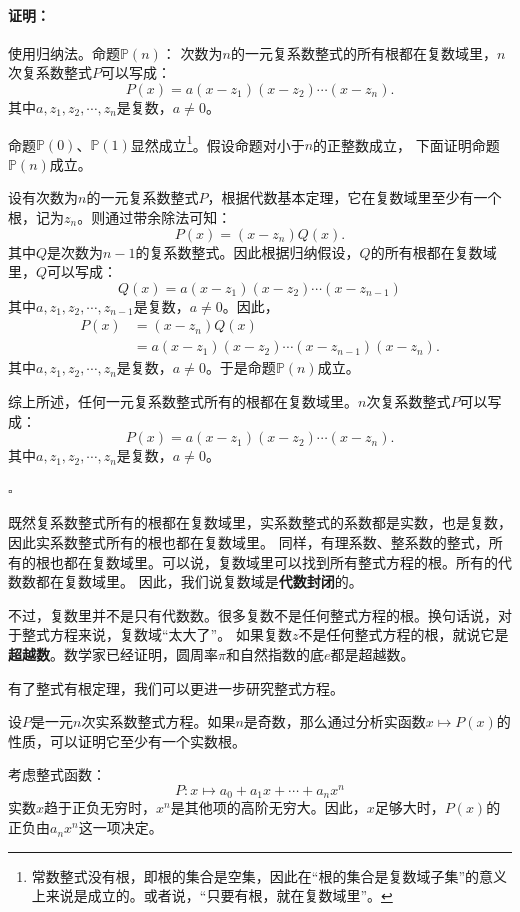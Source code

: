 \documentclass[12pt,UTF8]{ctexbook}
\theoremstyle{definition}
\theoremstyle{plain}
\renewenvironment{proof}{\paragraph{\textbf{证明：}}}{\hfill$\square$}
\begin{document}
\begin{appendix}
\begin{proof}
    使用归纳法。命题$\mathbb{P}(n)$：
    次数为$n$的一元复系数整式的所有根都在复数域里，$n$次复系数整式$P$可以写成：
    $$ P(x) = a(x - z_1)(x - z_2)\cdots(x - z_n).$$
    其中$a, z_1, z_2,\cdots, z_n$是复数，$a\neq 0$。 

    命题$\mathbb{P}(0)$、$\mathbb{P}(1)$显然成立\footnote{常数整式没有根，即根的集合是空集，因此在“根的集合是复数域子集”的意义上来说是成立的。或者说，“只要有根，就在复数域里”。}。假设命题对小于$n$的正整数成立，
    下面证明命题$\mathbb{P}(n)$成立。

    设有次数为$n$的一元复系数整式$P$，根据代数基本定理，它在复数域里至少有一个根，记为$z_n$。则通过带余除法可知：
    $$ P(x) = (x - z_n)Q(x).$$
    其中$Q$是次数为$n-1$的复系数整式。因此根据归纳假设，$Q$的所有根都在复数域里，$Q$可以写成：
    $$ Q(x) = a(x - z_1)(x - z_2)\cdots(x - z_{n-1})$$
    其中$a, z_1, z_2,\cdots, z_{n-1}$是复数，$a\neq 0$。因此，
    \begin{align*} 
        P(x) &= (x - z_n)Q(x) \\
        &= a(x - z_1)(x - z_2)\cdots(x - z_{n-1})(x - z_n).
    \end{align*}
    其中$a, z_1, z_2,\cdots, z_n$是复数，$a\neq 0$。于是命题$\mathbb{P}(n)$成立。

    综上所述，任何一元复系数整式所有的根都在复数域里。$n$次复系数整式$P$可以写成：
    $$ P(x) = a(x - z_1)(x - z_2)\cdots(x - z_n).$$
    其中$a, z_1, z_2,\cdots, z_n$是复数，$a\neq 0$。 

\end{proof}

既然复系数整式所有的根都在复数域里，实系数整式的系数都是实数，也是复数，因此实系数整式所有的根也都在复数域里。
同样，有理系数、整系数的整式，所有的根也都在复数域里。可以说，复数域里可以找到所有整式方程的根。所有的代数数都在复数域里。
因此，我们说复数域是\textbf{代数封闭}的。

不过，复数里并不是只有代数数。很多复数不是任何整式方程的根。换句话说，对于整式方程来说，复数域“太大了”。
如果复数$z$不是任何整式方程的根，就说它是\textbf{超越数}。数学家已经证明，圆周率$\pi$和自然指数的底$e$都是超越数。

有了整式有根定理，我们可以更进一步研究整式方程。

设$P$是一元$n$次实系数整式方程。如果$n$是奇数，那么通过分析实函数$x\mapsto P(x)$的性质，可以证明它至少有一个实数根。

考虑整式函数：
$$P: x\mapsto a_0 + a_1 x + \cdots + a_n x^n$$
实数$x$趋于正负无穷时，$x^n$是其他项的高阶无穷大。因此，$x$足够大时，$P(x)$的正负由$a_nx^n$这一项决定。


\end{appendix}
\end{document}
